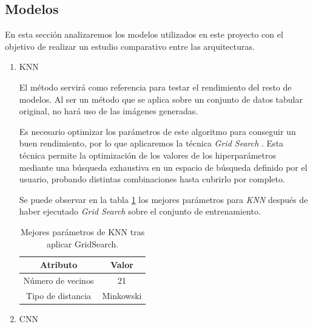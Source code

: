     \subsection{Modelos}


        En esta sección analizaremos los modelos utilizados en este proyecto con el objetivo de realizar un estudio comparativo entre las arquitecturas.


        \begin{enumerate}

            \item KNN

                El método  servirá como referencia para testar el rendimiento del resto de modelos. Al ser un método que se aplica sobre un conjunto de datos tabular original, no hará uso de las imágenes generadas.

                Es necesario optimizar los parámetros de este algoritmo para conseguir un buen rendimiento, por lo que aplicaremos la técnica \textit{Grid Search} \cite{GridSearchSklearnLibrary}. Esta técnica permite la optimización de los valores de los hiperparámetros mediante una búsqueda exhaustiva en un espacio de búsqueda definido por el usuario, probando distintas combinaciones hasta cubrirlo por completo. 


                Se puede observar en la tabla \ref{BestParamsKNNGridSearchTable} los mejores parámetros para \textit{KNN} después de haber ejecutado \textit{Grid Search} sobre el conjunto de entrenamiento.\\

                \begin{table}[H]
                    \centering
                    \begin{tabular}{ |c|c| }
                        \hline
                        Atributo & Valor\\
                        \hline
                            Número de vecinos & 21 \\ 
                            Tipo de distancia & Minkowski \\ 
                        \hline
                    \end{tabular}
                    \caption{Mejores parámetros de KNN tras aplicar GridSearch.}
                    \label{BestParamsKNNGridSearchTable}
                \end{table}


            \item CNN


\end{enumerate}
